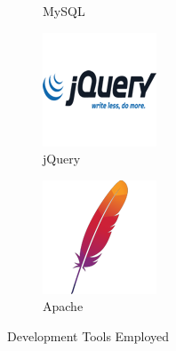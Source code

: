 \begin{figure}[H]
\begin{subfigure}[t]{0.2\linewidth}
		\caption{MySQL}\label{fig:MySQL}		
	\end{subfigure}
	\quad
	\begin{subfigure}[t]{0.2\linewidth}
		\centering
		\includegraphics[width=\linewidth]{Images/Generic/Icons/jQuery}
		\caption{jQuery}\label{fig:jQuery}
	\end{subfigure}
    \quad
	\begin{subfigure}[t]{0.2\linewidth}
		\centering
		\includegraphics[width=\linewidth]{Images/Generic/Icons/Apache}
		\caption{Apache}\label{fig:Apache}
	\end{subfigure}
	\caption{Development Tools Employed}\label{fig:DevelopmentTools}
\end{figure}

